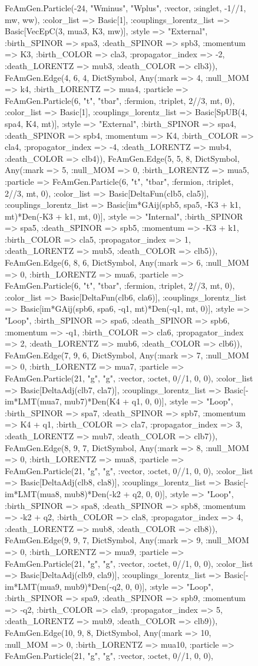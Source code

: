 \documentclass{revtex4}
\begin{document}
\begin{figure}[!htb]
\begin{center}
{FeAmGen.Particle(-24, "Wminus", "Wplus", :vector, :singlet, -1//1, mw, ww), :color_list => Basic[1], :couplings_lorentz_list => Basic[VecEpC(3, mua3, K3, mw)], :style => "External", :birth_SPINOR => spa3, :death_SPINOR => spb3, :momentum => K3, :birth_COLOR => cla3, :propagator_index => -2, :death_LORENTZ => mub3, :death_COLOR => clb3)), FeAmGen.Edge(4, 6, 4, Dict{Symbol, Any}(:mark => 4, :null_MOM => k4, :birth_LORENTZ => mua4, :particle => FeAmGen.Particle(6, "t", "tbar", :fermion, :triplet, 2//3, mt, 0), :color_list => Basic[1], :couplings_lorentz_list => Basic[SpUB(4, spa4, K4, mt)], :style => "External", :birth_SPINOR => spa4, :death_SPINOR => spb4, :momentum => K4, :birth_COLOR => cla4, :propagator_index => -4, :death_LORENTZ => mub4, :death_COLOR => clb4)), FeAmGen.Edge(5, 5, 8, Dict{Symbol, Any}(:mark => 5, :null_MOM => 0, :birth_LORENTZ => mua5, :particle => FeAmGen.Particle(6, "t", "tbar", :fermion, :triplet, 2//3, mt, 0), :color_list => Basic[DeltaFun(clb5, cla5)], :couplings_lorentz_list => Basic[im*GAij(spb5, spa5, -K3 + k1, mt)*Den(-K3 + k1, mt, 0)], :style => "Internal", :birth_SPINOR => spa5, :death_SPINOR => spb5, :momentum => -K3 + k1, :birth_COLOR => cla5, :propagator_index => 1, :death_LORENTZ => mub5, :death_COLOR => clb5)), FeAmGen.Edge(6, 8, 6, Dict{Symbol, Any}(:mark => 6, :null_MOM => 0, :birth_LORENTZ => mua6, :particle => FeAmGen.Particle(6, "t", "tbar", :fermion, :triplet, 2//3, mt, 0), :color_list => Basic[DeltaFun(clb6, cla6)], :couplings_lorentz_list => Basic[im*GAij(spb6, spa6, -q1, mt)*Den(-q1, mt, 0)], :style => "Loop", :birth_SPINOR => spa6, :death_SPINOR => spb6, :momentum => -q1, :birth_COLOR => cla6, :propagator_index => 2, :death_LORENTZ => mub6, :death_COLOR => clb6)), FeAmGen.Edge(7, 9, 6, Dict{Symbol, Any}(:mark => 7, :null_MOM => 0, :birth_LORENTZ => mua7, :particle => FeAmGen.Particle(21, "g", "g", :vector, :octet, 0//1, 0, 0), :color_list => Basic[DeltaAdj(clb7, cla7)], :couplings_lorentz_list => Basic[-im*LMT(mua7, mub7)*Den(K4 + q1, 0, 0)], :style => "Loop", :birth_SPINOR => spa7, :death_SPINOR => spb7, :momentum => K4 + q1, :birth_COLOR => cla7, :propagator_index => 3, :death_LORENTZ => mub7, :death_COLOR => clb7)), FeAmGen.Edge(8, 9, 7, Dict{Symbol, Any}(:mark => 8, :null_MOM => 0, :birth_LORENTZ => mua8, :particle => FeAmGen.Particle(21, "g", "g", :vector, :octet, 0//1, 0, 0), :color_list => Basic[DeltaAdj(clb8, cla8)], :couplings_lorentz_list => Basic[-im*LMT(mua8, mub8)*Den(-k2 + q2, 0, 0)], :style => "Loop", :birth_SPINOR => spa8, :death_SPINOR => spb8, :momentum => -k2 + q2, :birth_COLOR => cla8, :propagator_index => 4, :death_LORENTZ => mub8, :death_COLOR => clb8)), FeAmGen.Edge(9, 9, 7, Dict{Symbol, Any}(:mark => 9, :null_MOM => 0, :birth_LORENTZ => mua9, :particle => FeAmGen.Particle(21, "g", "g", :vector, :octet, 0//1, 0, 0), :color_list => Basic[DeltaAdj(clb9, cla9)], :couplings_lorentz_list => Basic[-im*LMT(mua9, mub9)*Den(-q2, 0, 0)], :style => "Loop", :birth_SPINOR => spa9, :death_SPINOR => spb9, :momentum => -q2, :birth_COLOR => cla9, :propagator_index => 5, :death_LORENTZ => mub9, :death_COLOR => clb9)), FeAmGen.Edge(10, 9, 8, Dict{Symbol, Any}(:mark => 10, :null_MOM => 0, :birth_LORENTZ => mua10, :particle => FeAmGen.Particle(21, "g", "g", :vector, :octet, 0//1, 0, 0), }
\end{center}
\end{figure}
\end{document}
